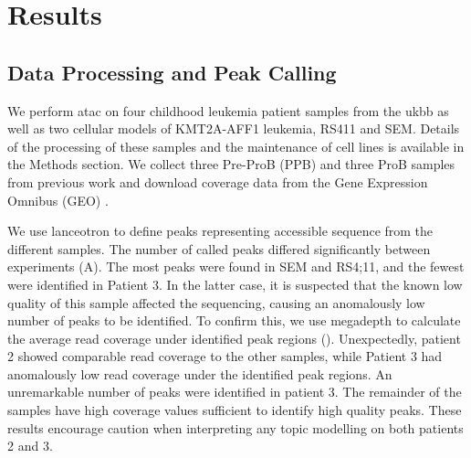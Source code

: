 \section{Results} \label{ch5:results}



\subsection{Data Processing and Peak Calling}

We perform \gls{atac} on four childhood leukemia patient samples from the \gls{ukbb} as well as two cellular models of KMT2A-AFF1 leukemia, RS411 and SEM. Details of the processing of these samples and the maintenance of cell lines is available in the Methods section. We collect three Pre-ProB (PPB) and three ProB samples from previous work and download coverage data from the Gene Expression Omnibus (GEO) \cite{OByrne2019}.  


We use lanceotron to define peaks representing accessible sequence from the different samples. The number of called peaks differed significantly between experiments (A). The most peaks were found in SEM and RS4;11, and the fewest were identified in Patient 3. In the latter case, it is suspected that the known low quality of this sample affected the sequencing, causing an anomalously low number of peaks to be identified. To confirm this, we use megadepth to calculate the average read coverage under identified peak regions \cite{Wilks2021} (). Unexpectedly, patient 2 showed comparable read coverage to the other samples, while Patient 3 had anomalously low read coverage under the identified peak regions. An unremarkable number of peaks were identified in patient 3. The remainder of the samples have high coverage values sufficient to identify high quality peaks. These results encourage caution when interpreting any topic modelling on both patients 2 and 3.  


